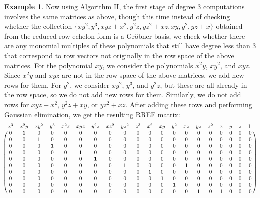 \documentclass[11pt]{article}
\theoremstyle{definition}
\newtheorem{example}{Example}
\begin{document}
\begin{example}
	Now using Algorithm II, the first stage of degree 3 computations involves the same matrices as above, though this time instead of checking whether the collection $\{xy^2, y^3, xyz + x^2, y^2z, yz^2 + xz, xy, y^2, yz + x\}$ obtained from the reduced row-echelon form is a Gröbner basis, we check whether there are any monomial multiples of these polynomials that still have degree less than 3 that correspond to row vectors not originally in the row space of the above matrices. For the polynomial $xy$, we consider the polynomials $x^2y$, $xy^2$, and $xyz$. Since $x^2y$ and $xyz$ are not in the row space of the above matrices, we add new rows for them. For $y^2$, we consider $xy^2$, $y^3$, and $y^2z$, but these are all already in the row space, so we do not add new rows for them. Similarly, we do not add rows for $xyz + x^2$, $y^2z + xy$, or $yz^2 + xz$. After adding these rows and performing Gaussian elimination, we get the resulting RREF matrix: \[ \begin{blockarray}{cccccccccccccccccccc}
		x^3 & x^2y & xy^2 & y^3 & x^2z & xyz & y^2z & xz^2 & yz^2 & z^3 & x^2 & xy & y^2 & xz & yz & z^2 & x & y & z & 1\,\, \\
		\begin{block}{(cccccccccccccccccccc)}
			0 & \mathbf{1} & 0 & 0 & 0 & 0 & 0 & 0 & 0 & 0 & 0 & 0 & 0 & 0 & 0 & 0 & 0 & 0 & 0 & 0 \\
			0 & 0 & \mathbf{1} & 0 & 0 & 0 & 0 & 0 & 0 & 0 & 0 & 0 & 0 & 0 & 0 & 0 & 0 & 0 & 0 & 0 \\
			0 & 0 & 0 & \mathbf{1} & 0 & 0 & 0 & 0 & 0 & 0 & 0 & 0 & 0 & 0 & 0 & 0 & 0 & 0 & 0 & 0 \\
			0 & 0 & 0 & 0 & 0 & \mathbf{1} & 0 & 0 & 0 & 0 & 0 & 0 & 0 & 0 & 0 & 0 & 0 & 0 & 0 & 0 \\
			0 & 0 & 0 & 0 & 0 & 0 & \mathbf{1} & 0 & 0 & 0 & 0 & 0 & 0 & 0 & 0 & 0 & 0 & 0 & 0 & 0 \\
			0 & 0 & 0 & 0 & 0 & 0 & 0 & 0 & \mathbf{1} & 0 & 0 & 0 & 0 & \mathbf{1} & 0 & 0 & 0 & 0 & 0 & 0 \\
			0 & 0 & 0 & 0 & 0 & 0 & 0 & 0 & 0 & 0 & \mathbf{1} & 0 & 0 & 0 & 0 & 0 & 0 & 0 & 0 & 0 \\
			0 & 0 & 0 & 0 & 0 & 0 & 0 & 0 & 0 & 0 & 0 & \mathbf{1} & 0 & 0 & 0 & 0 & 0 & 0 & 0 & 0 \\
			0 & 0 & 0 & 0 & 0 & 0 & 0 & 0 & 0 & 0 & 0 & 0 & \mathbf{1} & 0 & 0 & 0 & 0 & 0 & 0 & 0 \\
			0 & 0 & 0 & 0 & 0 & 0 & 0 & 0 & 0 & 0 & 0 & 0 & 0 & 0 & \mathbf{1} & 0 & \mathbf{1} & 0 & 0 & 0 \\

\end{block}
\end{blockarray}\]
\end{example}
\end{document}
